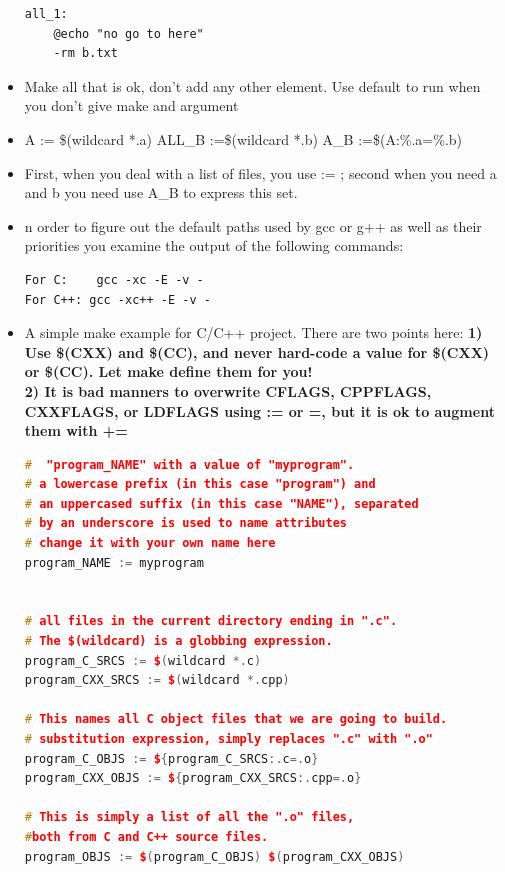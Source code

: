 \documentclass[a4paper,11pt,twoside]{book}
\begin{document}
\begin{itemize}
\begin{verbatim}
all_1:
	@echo "no go to here"
	-rm b.txt
\end{verbatim}		
		
		
		\item Make all that is ok, don't add any other element. Use default to run when you don't give make and argument

		\item A := \$(wildcard *.a)  ALL\_B :=\$(wildcard *.b)  A\_B :=\$(A:\%.a=\%.b)
		\item First, when you deal with a list of files, you use := ; second when you need a and b you need use A\_B to express this set.
		
		\item n order to figure out the default paths used by gcc or g++ as well as their priorities you examine the output of the following commands:
\begin{verbatim}
For C:    gcc -xc -E -v -
For C++: gcc -xc++ -E -v -
\end{verbatim}

\item A simple make example for C/C++ project. There are two points here: \textbf{1) Use \$(CXX) and \$(CC), and never hard-code a value for \$(CXX) or \$(CC). Let make define them for you! } \\

\textbf{2) It is bad manners to overwrite CFLAGS, CPPFLAGS, CXXFLAGS, or LDFLAGS using := or =, but it is ok to augment them with += }

\begin{lstlisting}[frame=single,  basicstyle=\small, language=c++, mathescape=false]
#  "program_NAME" with a value of "myprogram". 
# a lowercase prefix (in this case "program") and 
# an uppercased suffix (in this case "NAME"), separated
# by an underscore is used to name attributes
# change it with your own name here 
program_NAME := myprogram


# all files in the current directory ending in ".c". 
# The $(wildcard) is a globbing expression. 
program_C_SRCS := $(wildcard *.c)
program_CXX_SRCS := $(wildcard *.cpp)

# This names all C object files that we are going to build. 
# substitution expression, simply replaces ".c" with ".o"
program_C_OBJS := ${program_C_SRCS:.c=.o}
program_CXX_OBJS := ${program_CXX_SRCS:.cpp=.o}

# This is simply a list of all the ".o" files, 
#both from C and C++ source files.
program_OBJS := $(program_C_OBJS) $(program_CXX_OBJS)


\end{lstlisting}
\end{itemize}
\end{document}
